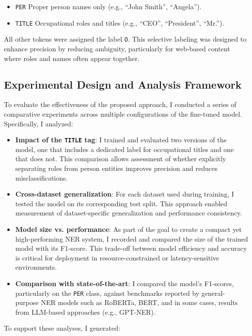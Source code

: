 \documentclass[a4paper]{usiinfbachelorproject}
\begin{document}
\begin{itemize}
  \item \texttt{PER}   Proper person names only (e.g., “John Smith”, “Angela”).
  \item \texttt{TITLE}   Occupational roles and titles (e.g., “CEO”, “President”, “Mr.”).
\end{itemize}

All other tokens were assigned the label \texttt{O}. This selective labeling was designed to enhance precision by reducing ambiguity, particularly for web-based content where roles and names often appear together.

\subsection{Experimental Design and Analysis Framework}
To evaluate the effectiveness of the proposed approach, I conducted a series of comparative experiments across multiple configurations of the fine-tuned model. Specifically, I analyzed:

\begin{itemize}
  \item \textbf{Impact of the \texttt{TITLE} tag}: I trained and evaluated two versions of the model, one that includes a dedicated label for occupational titles and one that does not. This comparison allows assessment of whether explicitly separating roles from person entities improves precision and reduces misclassifications.
  \item \textbf{Cross-dataset generalization}: For each dataset used during training, I tested the model on its corresponding test split. This approach enabled measurement of dataset-specific generalization and performance consistency.
  \item \textbf{Model size vs. performance}: As part of the goal to create a compact yet high-performing NER system, I recorded and compared the size of the trained model with its F1-score. This trade-off between model efficiency and accuracy is critical for deployment in resource-constrained or latency-sensitive environments.
  \item \textbf{Comparison with state-of-the-art}: I compared the model’s F1-scores, particularly on the \texttt{PER} class, against benchmarks reported by general-purpose NER models such as RoBERTa, BERT, and in some cases, results from LLM-based approaches (e.g., GPT-NER).
\end{itemize}

To support these analyses, I generated:
\end{document}

